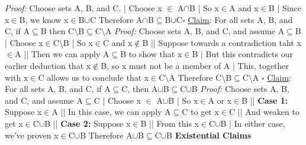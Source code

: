 \documentclass{article}
\begin{document}
\begin{tiny}
\textit{Proof: } Choose sets A, B, and C.\newline
|	Choose x $\in$ A$\cap$B\newline
|	So x$\in$A and x$\in$B\newline
|	Since x$\in$B, we know x$\in$B$\cup$C\newline
Therefore A$\cap$B$\subseteq$B$\cup$C$\square$\newline\newline
\underline{Claim}: For all sets A, B, and C, if A$\subseteq$B then C$\setminus$B$\subseteq$C$\setminus$A\newline
\textit{Proof: } Choose sets A, B, and C, and assume A$\subseteq$B\newline
|	Choose x$\in$C$\setminus$B\newline
|	So x$\in$C and x$\notin$B\newline
||		Suppose towards a contradiction taht x$\in$A\newline
||		Then we can apply A$\subseteq$B to show that x$\in$B\newline
|	But this contradicts our earlier deduction that x$\notin$B, so x must not be a member of A\newline
|	This, together with x$\in$C allows us to conclude that x$\in$C$\setminus$A\newline
Therefore C$\setminus$B$\subseteq$C$\setminus$A $\square$\newline\newline
\underline{Claim}: For all sets A, B, and C, if A$\subseteq$C, then A$\cup$B$\subseteq$C$\cup$B\newline
\textit{Proof: } Choose sets A, B, and C, and assume A$\subseteq$C\newline
|	Choose x $\in$ A$\cup$B\newline
|	So x$\in$A or x$\in$B\newline
||		\textbf{Case 1:} Suppose x$\in$A\newline
||		In this case, we can apply A$\subseteq$C to get x$\in$C\newline
||		And weaken to get x$\in$C$\cup$B\newline
||		\textbf{Case 2:} Suppose x$\in$B\newline
||		From this x$\in$C$\cup$B\newline
|	In either case, we've proven x$\in$C$\cup$B\newline
Therefore A$\cup$B$\subseteq$C$\cup$B\newline\newline
\textbf{Existential Claims}\newline

\end{tiny}
\end{document}

